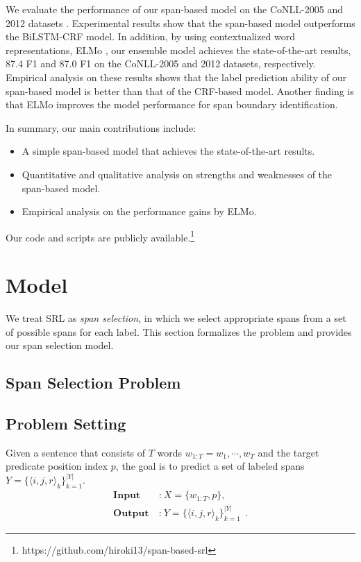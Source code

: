 \documentclass[11pt,a4paper]{article}
\begin{document}
We evaluate the performance of our span-based model on the CoNLL-2005 and 2012 datasets \cite{carreras:05,pradhan:12}.
Experimental results show that the span-based model outperforms the BiLSTM-CRF model.
In addition, by using contextualized word representations, ELMo \cite{peters:18}, our ensemble model achieves the state-of-the-art results, 87.4 F1 and 87.0 F1 on the CoNLL-2005 and 2012 datasets, respectively.
Empirical analysis on these results shows that the label prediction ability of our span-based model is better than that of the CRF-based model.
Another finding is that ELMo improves the model performance for span boundary identification.

In summary, our main contributions include:
\begin{itemize}
\setlength{\parskip}{0cm} 
\setlength{\itemsep}{0cm} 
\item A simple span-based model that achieves the state-of-the-art results.
\item Quantitative and qualitative analysis on strengths and weaknesses of the span-based model.
\item Empirical analysis on the performance gains by ELMo.
\end{itemize}

\noindent
Our code and scripts are publicly available.\footnote{https://github.com/hiroki13/span-based-srl}


\section{Model}
\label{sec:problem}
We treat SRL as {\it span selection}, in which we select appropriate spans from a set of possible spans for each label.
This section formalizes the problem and provides our span selection model.

\subsection{Span Selection Problem}
\subsection*{Problem Setting}
Given a sentence that consists of $T$ words $w_{1:T} = w_1, \cdots, w_T$ and the target predicate position index $p$, the goal is to predict a set of labeled spans $Y = \{ \langle i, j, r \rangle_k \}^{|Y|}_{k=1}$.
\begin{align*}
\textbf{Input} \: & \text{:} \: X = \{ w_{1:T}, p \}, \\
\textbf{Output} \: & \text{:} \: Y = \{ \langle i, j, r \rangle_k \}^{|Y|}_{k=1} \:\:.
\end{align*}
\end{document}
